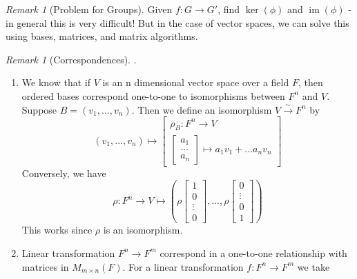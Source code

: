 \documentclass[12pt]{article}
\theoremstyle{definition}
\theoremstyle{remark}
\newtheorem{rmk}[thm]{Remark}
\numberwithin{equation}{section}
\DeclareMathOperator{\im}{im}
\begin{document}
\vspace{15pt}


\begin{rmk}[Problem for Groups]
        Given $f:G \rightarrow G'$, find $\ker(\phi)$ and $\im(\phi)$ - in general this is very difficult! But in the case of vector spaces, we can solve this using bases, matrices, and matrix algorithms.
\end{rmk}


\vspace{15pt}

\begin{rmk}[Correspondences]
        .\newline \begin{enumerate}
                \item We know that if $V$ is an n dimensional vector space over a field $F$, then ordered bases correspond one-to-one to isomorphisms between $F^n$ and $V$. Suppose $B=(v_1,...,v_n)$. Then we define an isomorphism $V \xrightarrow{\sim} F^n$ by \begin{equation}
                                (v_1,...,v_n)\mapsto \begin{bmatrix} \rho_B:F^n \rightarrow V \\ \begin{bmatrix} a_1 \\ \hdots \\ a_n \end{bmatrix} \mapsto a_1v_1+...a_nv_n \end{bmatrix}
                \end{equation}
                Conversely, we have \begin{equation}
                        \rho:F^n \rightarrow V \mapsto \left(\rho\begin{bmatrix} 1 \\ 0 \\ \vdots \\ 0 \end{bmatrix}, ..., \rho\begin{bmatrix} 0 \\ \vdots \\ 0 \\ 1 \end{bmatrix}\right)
                \end{equation}
                This works since $\rho$ is an isomorphism.
        \item Linear transformation $F^n \rightarrow F^m$ correspond in a one-to-one relationship with matrices in $M_{m\times n}(F)$. For a linear transformation $f:F^n \rightarrow F^m$ we take \begin{equation}

\end{equation}
\end{enumerate}
\end{rmk}
\end{document}
